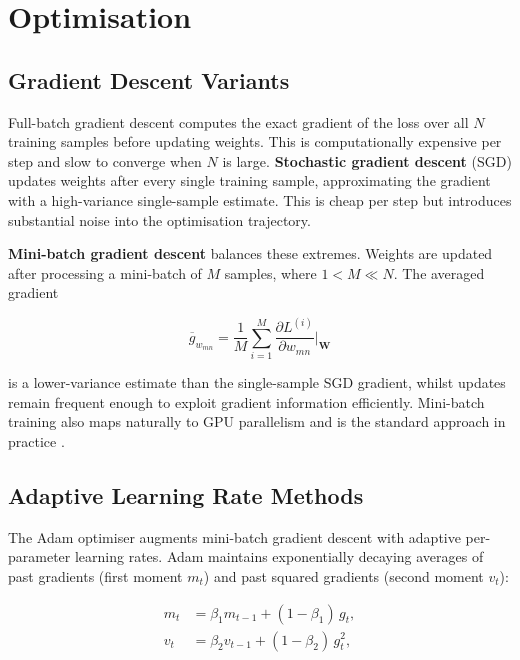     \section*{Optimisation}

    \subsection*{Gradient Descent Variants}

    Full-batch gradient descent computes the exact gradient of the loss over all $N$
    training samples before updating weights. This is computationally expensive per
    step and slow to converge when $N$ is large. \textbf{Stochastic gradient descent}
    (SGD) updates weights after every single training sample, approximating the
    gradient with a high-variance single-sample estimate. This is cheap per step but
    introduces substantial noise into the optimisation trajectory.

    \textbf{Mini-batch gradient descent} balances these extremes. Weights are updated
    after processing a mini-batch of $M$ samples, where $1 < M \ll N$. The averaged
    gradient

    \[
    \overline{g}_{w_{mn}} = \frac{1}{M} \sum_{i=1}^{M}
    \frac{\partial L^{(i)}}{\partial w_{mn}}\bigg|_\mathbf{W}
    \]

    is a lower-variance estimate than the single-sample SGD gradient, whilst updates
    remain frequent enough to exploit gradient information efficiently. Mini-batch
    training also maps naturally to GPU parallelism and is the standard approach
    in practice \citep{goodfellow2016deep}.

    \subsection*{Adaptive Learning Rate Methods}

    The Adam optimiser \citep{kingma2015adam} augments mini-batch gradient descent
    with adaptive per-parameter learning rates. Adam maintains exponentially decaying
    averages of past gradients (first moment $m_t$) and past squared gradients (second
    moment $v_t$):

    \begin{align*}
    m_t &= \beta_1 m_{t-1} + (1 - \beta_1)\, g_t, \\
    v_t &= \beta_2 v_{t-1} + (1 - \beta_2)\, g_t^2,
    \end{align*}

